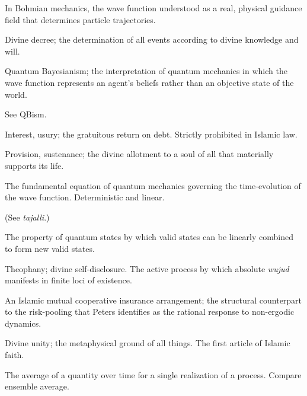 \documentclass[11pt,a4paper]{book}
\theoremstyle{cleanrm}
\begin{document}
\begin{description}[leftmargin=3.5cm,style=nextline]
\item[Pilot wave] In Bohmian mechanics, the wave function understood
as a real, physical guidance field that determines particle
trajectories.

\item[\emph{Qadar}] Divine decree; the determination of all events
according to divine knowledge and will.

\item[QBism] Quantum Bayesianism; the interpretation of quantum
mechanics in which the wave function represents an agent's beliefs
rather than an objective state of the world.

\item[Quantum Bayesianism] See QBism.

\item[\emph{Riba}] Interest, usury; the gratuitous return on debt.
Strictly prohibited in Islamic law.

\item[\emph{Rizq}] Provision, sustenance; the divine allotment to a
soul of all that materially supports its life.

\item[Schr\"odinger equation] The fundamental equation of quantum
mechanics governing the time-evolution of the wave function.
Deterministic and linear.

\item[Self-disclosure] (See \emph{tajalli}.)

\item[Superposition] The property of quantum states by which valid
states can be linearly combined to form new valid states.

\item[\emph{Tajalli}] Theophany; divine self-disclosure. The active
process by which absolute \emph{wujud} manifests in finite loci of
existence.

\item[\emph{Takaful}] An Islamic mutual cooperative insurance
arrangement; the structural counterpart to the risk-pooling that
Peters identifies as the rational response to non-ergodic dynamics.

\item[\emph{Tawhid}] Divine unity; the metaphysical ground of all
things. The first article of Islamic faith.

\item[Time average] The average of a quantity over time for a single
realization of a process. Compare ensemble average.


\end{description}
\end{document}
